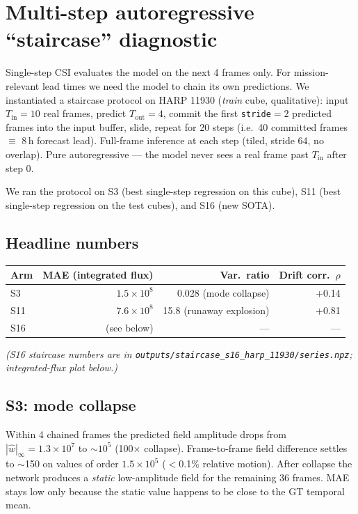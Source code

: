 \section{Multi-step autoregressive ``staircase'' diagnostic}\label{sec:cmp_intflux}

Single-step CSI evaluates the model on the next 4 frames only.
For mission-relevant lead times we need the model to chain its own
predictions. We instantiated a staircase protocol on HARP 11930
(\emph{train} cube, qualitative): input \(T_{\text{in}}=10\) real
frames, predict \(T_{\text{out}}=4\), commit the first
\texttt{stride}\(=2\) predicted frames into the input buffer, slide,
repeat for 20 steps (i.e.\ 40 committed frames \(\equiv\) 8\,h forecast
lead). Full-frame inference at each step (tiled, stride 64, no
overlap). Pure autoregressive --- the model never sees a real frame
past \(T_{\text{in}}\) after step 0.

We ran the protocol on S3 (best single-step regression on this cube),
S11 (best single-step regression on the test cubes), and S16 (new
SOTA).

\subsection*{Headline numbers}
\begin{center}\small
\begin{tabular}{l r r r}
\toprule
Arm & MAE (integrated flux) & Var.\ ratio & Drift corr.\ \(\rho\)\\
\midrule
S3  & \(1.5\!\times\!10^8\) & 0.028 (mode collapse)      & +0.14 \\
S11 & \(7.6\!\times\!10^8\) & 15.8 (runaway explosion)   & +0.81 \\
S16 & (see below)                 & ---                       & ---   \\
\bottomrule
\end{tabular}
\end{center}

\emph{(S16 staircase numbers are in \texttt{outputs/staircase\_s16\_harp\_11930/series.npz}; integrated-flux plot below.)}

\subsection*{S3: mode collapse}
Within 4 chained frames the predicted field amplitude drops from
\(|\hat w|_\infty\!=\!1.3\!\times\!10^7\) to
\(\sim\!10^5\) (100\(\times\) collapse). Frame-to-frame field
difference settles to \(\sim\)150 on values of order \(1.5\!\times\!10^5\)
(\(<\)0.1\% relative motion). After collapse the network produces a
\emph{static} low-amplitude field for the remaining 36 frames. MAE
stays low only because the static value happens to be close to the
GT temporal mean.

